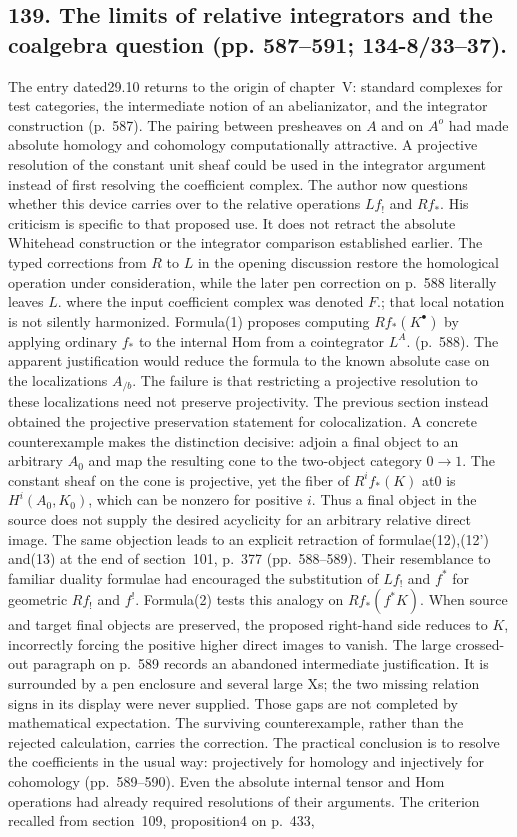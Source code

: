 \documentclass[10pt,oneside]{book}
\begin{document}
\subsection*{139. The limits of relative integrators and the coalgebra question (pp. 587--591; 134-8/33--37).}
The entry dated29.10 returns to the origin of chapter~V: standard complexes for test categories, the intermediate notion of an abelianizator, and the integrator construction (p.~587). The pairing between presheaves on $A$ and on $A^o$ had made absolute homology and cohomology computationally attractive. A projective resolution of the constant unit sheaf could be used in the integrator argument instead of first resolving the coefficient complex. The author now questions whether this device carries over to the relative operations $Lf_!$ and $Rf_*$. His criticism is specific to that proposed use. It does not retract the absolute Whitehead construction or the integrator comparison established earlier. The typed corrections from $R$ to $L$ in the opening discussion restore the homological operation under consideration, while the later pen correction on p.~588 literally leaves $L.$ where the input coefficient complex was denoted $F.$; that local notation is not silently harmonized. Formula(1) proposes computing $Rf_*(K^\bullet)$ by applying ordinary $f_*$ to the internal Hom from a cointegrator $L^A.$ (p.~588). The apparent justification would reduce the formula to the known absolute case on the localizations $A_{/b}$. The failure is that restricting a projective resolution to these localizations need not preserve projectivity. The previous section instead obtained the projective preservation statement for colocalization. A concrete counterexample makes the distinction decisive: adjoin a final object to an arbitrary $A_0$ and map the resulting cone to the two-object category $0\to1$. The constant sheaf on the cone is projective, yet the fiber of $R^if_*(K)$ at0 is $H^i(A_0,K_0)$, which can be nonzero for positive $i$. Thus a final object in the source does not supply the desired acyclicity for an arbitrary relative direct image. The same objection leads to an explicit retraction of formulae(12),(12') and(13) at the end of section~101, p.~377 (pp.~588--589). Their resemblance to familiar duality formulae had encouraged the substitution of $Lf_!$ and $f^*$ for geometric $Rf_!$ and $f^!$. Formula(2) tests this analogy on $Rf_*(f^*K)$. When source and target final objects are preserved, the proposed right-hand side reduces to $K$, incorrectly forcing the positive higher direct images to vanish. The large crossed-out paragraph on p.~589 records an abandoned intermediate justification. It is surrounded by a pen enclosure and several large Xs; the two missing relation signs in its display were never supplied. Those gaps are not completed by mathematical expectation. The surviving counterexample, rather than the rejected calculation, carries the correction. The practical conclusion is to resolve the coefficients in the usual way: projectively for homology and injectively for cohomology (pp.~589--590). Even the absolute internal tensor and Hom operations had already required resolutions of their arguments. The criterion recalled from section~109, proposition4 on p.~433, 
\end{document}
